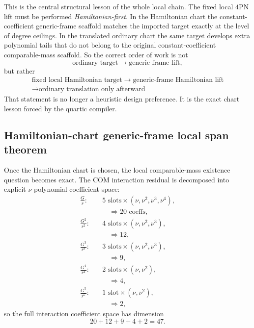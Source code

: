 \documentclass[11pt]{article}
\begin{document}
This is the central structural lesson of the whole local chain.  The fixed local
$4$PN lift must be performed \emph{Hamiltonian-first}.  In the Hamiltonian chart
the constant-coefficient generic-frame scaffold matches the imported target
exactly at the level of degree ceilings.  In the translated ordinary chart the
same target develops extra polynomial tails that do not belong to the original
constant-coefficient comparable-mass scaffold.  So the correct order of work is
not
\[
\text{ordinary target} \longrightarrow \text{generic-frame lift},
\]
but rather
\begin{equation}
\boxed{
\begin{gathered}
\text{fixed local Hamiltonian target}
\;\longrightarrow\;
\text{generic-frame Hamiltonian lift}
\\
\longrightarrow
\text{ordinary translation only afterward}
\end{gathered}
}
\label{eq:4pn-local-hamiltonian-first-scheme}
\end{equation}
That statement is no longer a heuristic design preference.  It is the exact
chart lesson forced by the quartic compiler.

\subsection{Hamiltonian-chart generic-frame local span theorem}
\label{sec:local-hamiltonian-lift}

Once the Hamiltonian chart is chosen, the local comparable-mass existence
question becomes exact.  The COM interaction residual is decomposed into
explicit $\nu$-polynomial coefficient space:
\begin{equation}
\begin{aligned}
\frac{G}{r}:&\quad 5\text{ slots}\times(\nu,\nu^2,\nu^3,\nu^4),\\
&\qquad\Rightarrow 20\text{ coeffs},\\
\frac{G^2}{r^2}:&\quad 4\text{ slots}\times(\nu,\nu^2,\nu^3),\\
&\qquad\Rightarrow 12,\\
\frac{G^3}{r^3}:&\quad 3\text{ slots}\times(\nu,\nu^2,\nu^3),\\
&\qquad\Rightarrow 9,\\
\frac{G^4}{r^4}:&\quad 2\text{ slots}\times(\nu,\nu^2),\\
&\qquad\Rightarrow 4,\\
\frac{G^5}{r^5}:&\quad 1\text{ slot}\times(\nu,\nu^2),\\
&\qquad\Rightarrow 2,
\end{aligned}
\label{eq:4pn-local-polynomial-coefficient-space}
\end{equation}
so the full interaction coefficient space has dimension
\begin{equation}
20+12+9+4+2 = 47.
\label{eq:4pn-local-interaction-rank-target}
\end{equation}
\end{document}
